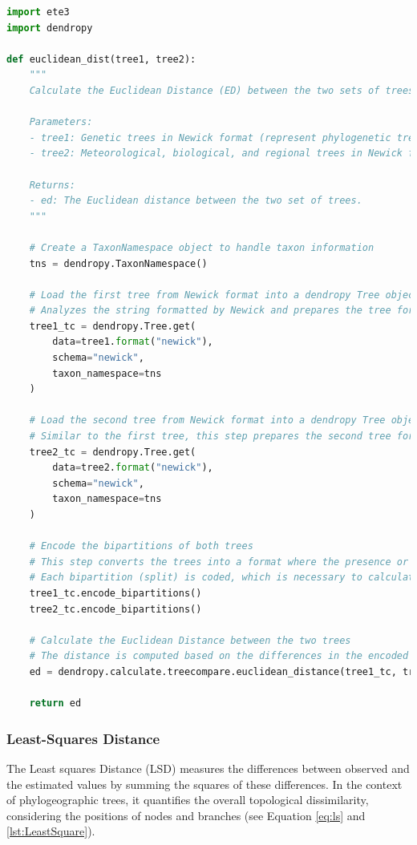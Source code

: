 \begin{lstlisting}[label=lst:euclideanDist,language=Python,caption=Python script for calculating the ED using the ete3 and the dendropy packages in the aPhyloGeo package]
import ete3
import dendropy

def euclidean_dist(tree1, tree2):
    """
    Calculate the Euclidean Distance (ED) between the two sets of trees.

    Parameters:
    - tree1: Genetic trees in Newick format (represent phylogenetic trees in text form).
    - tree2: Meteorological, biological, and regional trees in Newick format (represent attributes trees in text form).

    Returns:
    - ed: The Euclidean distance between the two set of trees.
    """
    
    # Create a TaxonNamespace object to handle taxon information
    tns = dendropy.TaxonNamespace()

    # Load the first tree from Newick format into a dendropy Tree object
    # Analyzes the string formatted by Newick and prepares the tree for comparison.
    tree1_tc = dendropy.Tree.get(
        data=tree1.format("newick"), 
        schema="newick", 
        taxon_namespace=tns
    )
    
    # Load the second tree from Newick format into a dendropy Tree object
    # Similar to the first tree, this step prepares the second tree for comparison.
    tree2_tc = dendropy.Tree.get(
        data=tree2.format("newick"), 
        schema="newick", 
        taxon_namespace=tns
    )

    # Encode the bipartitions of both trees
    # This step converts the trees into a format where the presence or absence of 
    # Each bipartition (split) is coded, which is necessary to calculate distances.
    tree1_tc.encode_bipartitions()
    tree2_tc.encode_bipartitions()

    # Calculate the Euclidean Distance between the two trees
    # The distance is computed based on the differences in the encoded bipartitions.
    ed = dendropy.calculate.treecompare.euclidean_distance(tree1_tc, tree2_tc)

    return ed
\end{lstlisting}

\subsubsection{Least-Squares Distance}\label{LS}
The Least squares Distance (LSD) measures the differences between observed and the estimated values by summing the squares of these differences. In the context of phylogeographic trees, it quantifies the overall topological dissimilarity, considering the positions of nodes and branches (see Equation \eqref{eq:ls} and \autoref{lst:LeastSquare}).

